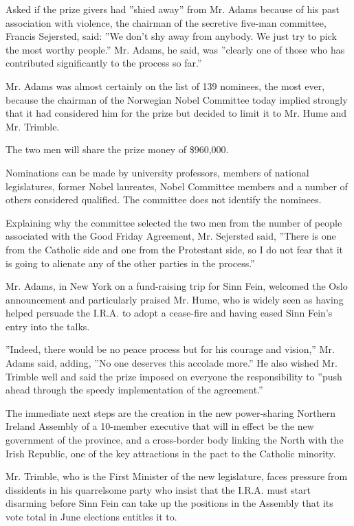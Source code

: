 Asked if the prize givers had ''shied away'' from Mr. Adams because of
his past association with violence, the chairman of the secretive
five-man committee, Francis Sejersted, said: ''We don't shy away from
anybody. We just try to pick the most worthy people.'' Mr. Adams, he
said, was ''clearly one of those who has contributed significantly to
the process so far.''

Mr. Adams was almost certainly on the list of 139 nominees, the most
ever, because the chairman of the Norwegian Nobel Committee today
implied strongly that it had considered him for the prize but decided to
limit it to Mr. Hume and Mr. Trimble.

The two men will share the prize money of \$960,000.

Nominations can be made by university professors, members of national
legislatures, former Nobel laureates, Nobel Committee members and a
number of others considered qualified. The committee does not identify
the nominees.

Explaining why the committee selected the two men from the number of
people associated with the Good Friday Agreement, Mr. Sejersted said,
''There is one from the Catholic side and one from the Protestant side,
so I do not fear that it is going to alienate any of the other parties
in the process.''

Mr. Adams, in New York on a fund-raising trip for Sinn Fein, welcomed
the Oslo announcement and particularly praised Mr. Hume, who is widely
seen as having helped persuade the I.R.A. to adopt a cease-fire and
having eased Sinn Fein's entry into the talks.

''Indeed, there would be no peace process but for his courage and
vision,'' Mr. Adams said, adding, ''No one deserves this accolade
more.'' He also wished Mr. Trimble well and said the prize imposed on
everyone the responsibility to ''push ahead through the speedy
implementation of the agreement.''

The immediate next steps are the creation in the new power-sharing
Northern Ireland Assembly of a 10-member executive that will in effect
be the new government of the province, and a cross-border body linking
the North with the Irish Republic, one of the key attractions in the
pact to the Catholic minority.

Mr. Trimble, who is the First Minister of the new legislature, faces
pressure from dissidents in his quarrelsome party who insist that the
I.R.A. must start disarming before Sinn Fein can take up the positions
in the Assembly that its vote total in June elections entitles it to.


